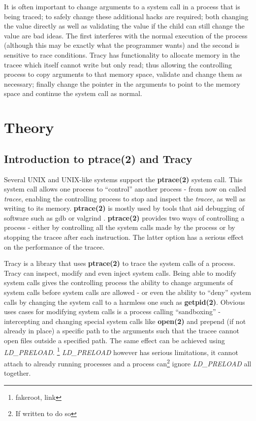 \documentclass[a4paper, twoside, 10pt, twocolumn]{report}
\begin{document}
It is often important to change arguments to a system call in a process that is
being traced; to
safely change these additional hacks are required; both changing the value
directly as well as validating the value if the child can still change the value
are bad ideas. The first interferes with the normal execution of the process
(although this may be exactly what the programmer wants) and the second is
sensitive to race conditions. Tracy has functionality to allocate memory in the
tracee which itself cannot write but only read; thus allowing the controlling
process to copy arguments to that memory space, validate and change them as
necessary; finally change the pointer in the arguments to point to the memory
space and continue the system call as normal.

\chapter{Theory}

\section{Introduction to ptrace(2) and Tracy}

Several UNIX and UNIX-like systems support the \textbf{ptrace(2)} system call.
This system call allows one process to ``control'' another process - from now on
called \textit{tracee}, enabling the controlling process to stop and inspect
the \textit{tracee}, as well as writing to its memory. \textbf{ptrace(2)} is
mostly used by tools that aid debugging of software such as gdb\cite{} or
valgrind \cite{}. \textbf{ptrace(2)} provides two ways of controlling a process
- either by controlling all the system calls made by the process or by stopping
the tracee after each instruction. The latter option has a serious effect on the
performance of the tracee.

Tracy is a library that uses \textbf{ptrace(2)} to trace the system calls of a
process. Tracy can inspect, modify and even inject system calls. Being able to
modify system calls gives the controlling process the ability to change
arguments of system calls before system calls are allowed - or even the ability
to ``deny'' system calls by changing the system call to a harmless one such as
\textbf{getpid(2)}. Obvious uses cases for modifying system calls is a process
calling ``sandboxing'' - intercepting and changing special system calls like
\textbf{open(2)} and prepend (if not already in place) a specific path to the
arguments such that the tracee cannot open files outside a specified path.
The same effect can be achieved using \textit{LD\_PRELOAD}. \footnote{fakeroot,
link} \textit{LD\_PRELOAD} however has serious limitations, it cannot attach to
already running processes and a process can\footnote{If written to do so} ignore
\textit{LD\_PRELOAD} all together.
\end{document}
